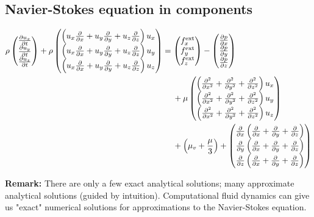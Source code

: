 \subsection{Navier-Stokes equation in components}
\begin{align}
\begin{split}\rho
\begin{pmatrix}
\frac{\partial u_x}{\partial t} \\ \frac{\partial u_y}{\partial t} \\ \frac{\partial u_z}{\partial t}
\end{pmatrix} +
\rho
\begin{pmatrix}
\left(u_x\frac{\partial }{\partial x}+u_y\frac{\partial }{\partial y}+u_z\frac{\partial }{\partial z}\right)u_x \\
\left(u_x\frac{\partial }{\partial x}+u_y\frac{\partial }{\partial y}+u_z\frac{\partial }{\partial z}\right)u_y \\
\left(u_x\frac{\partial }{\partial x}+u_y\frac{\partial }{\partial y}+u_z\frac{\partial }{\partial z}\right)u_z
\end{pmatrix} &= 
\begin{pmatrix}
f_x^\mathrm{ext} \\ f_y^\mathrm{ext} \\ f_z^\mathrm{ext}
\end{pmatrix} -
\begin{pmatrix}
\frac{\partial p}{\partial x} \\ \frac{\partial p}{\partial y} \\ \frac{\partial p}{\partial z}
\end{pmatrix} \\
&\hspace{4.5mm}+
\mu
\begin{pmatrix}
\left(\frac{\partial^2 }{\partial x^2}+\frac{\partial^2 }{\partial y^2}+\frac{\partial^2 }{\partial z^2}\right)u_x \\
\left(\frac{\partial^2 }{\partial x^2}+\frac{\partial^2 }{\partial y^2}+\frac{\partial^2 }{\partial z^2}\right)u_y \\
\left(\frac{\partial^2 }{\partial x^2}+\frac{\partial^2 }{\partial y^2}+\frac{\partial^2 }{\partial z^2}\right)u_z
\end{pmatrix} \\
&\hspace{4.5mm}+
\left(\mu_v + \frac{\mu}{3}\right) +
\begin{pmatrix}
\frac{\partial }{\partial x}\left(\frac{\partial }{\partial x}+\frac{\partial }{\partial y}+\frac{\partial }{\partial z}\right) \\
\frac{\partial }{\partial y}\left(\frac{\partial }{\partial x}+\frac{\partial }{\partial y}+\frac{\partial }{\partial z}\right) \\
\frac{\partial }{\partial z}\left(\frac{\partial }{\partial x}+\frac{\partial }{\partial y}+\frac{\partial }{\partial z}\right)
\end{pmatrix}
\end{split}
\end{align}

\begin{framed}
\textbf{Remark:} There are only a few exact analytical solutions; many approximate analytical solutions (guided by intuition). Computational fluid dynamics can give us "exact" numerical solutions for approximations to the Navier-Stokes equation.
\end{framed}

